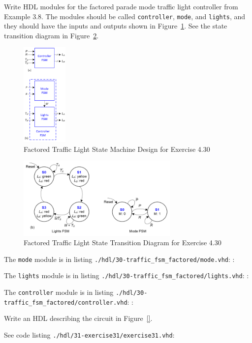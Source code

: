 \documentclass[12pt]{article}
\newenvironment{ex}[2][Exercise]{\begin{trivlist}
		\item[\hskip \labelsep {\bfseries #1}\hskip \labelsep {\bfseries #2.}]}{\end{trivlist}}
\newenvironment{sol}[1][Solution]{\begin{trivlist}
		\item[\hskip \labelsep {\bfseries #1:}]}{\end{trivlist}}
\begin{document}
\begin{ex}{4.30}
	Write HDL modules for the factored parade mode traffic light controller
	from Example 3.8. The modules should be called \texttt{controller},
	\texttt{mode}, and \texttt{lights}, and they should have the inputs
	and outputs shown in Figure~\ref{04-30-factored-traffic-fsm-design}.
	See the state transition diagram in Figure~\ref{04-30-factored-transition-diagrams}.
	\begin{figure}
		\centering
		\includegraphics[width=0.2\textwidth]{04-30-factored-traffic-fsm-design}
		\caption{Factored Traffic Light State Machine Design for Exercise 4.30}
		\label{04-30-factored-traffic-fsm-design}
	\end{figure}
	\begin{figure}
	\centering
	\includegraphics[width=0.7\textwidth]{04-30-factored-transition-diagrams}
	\caption{Factored Traffic Light State Transition Diagram for Exercise 4.30}
	\label{04-30-factored-transition-diagrams}
\end{figure}
\end{ex}

\begin{sol}
	The \texttt{mode} module is in listing \texttt{./hdl/30-traffic\_fsm\_factored/mode.vhd}:
	:
	
	The \texttt{lights} module is in listing \texttt{./hdl/30-traffic\_fsm\_factored/lights.vhd}:
	:
	
	The \texttt{controller} module is in listing \texttt{./hdl/30-traffic\_fsm\_factored/controller.vhd}:
	:
\end{sol}

\begin{ex}{4.31}
	Write an HDL describing the circuit in Figure~\ref{}. 
\end{ex}

\begin{sol}
	See code listing \texttt{./hdl/31-exercise31/exercise31.vhd}:
	
\end{sol}
\end{document}
